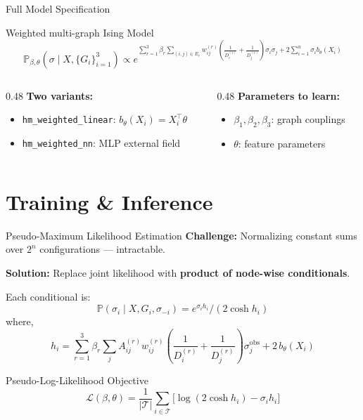 \documentclass[10pt]{beamer}
\begin{document}
\begin{frame}{Full Model Specification}
  \begin{block}{Weighted multi-graph Ising Model}
    \[
      \mathbb{P}_{\beta,\theta}(\sigma \mid X, \{G_i\}_{i=1}^3)
      \propto
      e^{\sum_{r=1}^{3} \beta_r \sum_{(i,j)\in E_r} w_{ij}^{(r)}\left(\frac{1}{D_i^{(r)}} + \frac{1}{D_j^{(r)}}\right)\sigma_i\sigma_j
        +
        2\sum_{i=1}^n \sigma_i b_\theta(X_i)}
    \]
  \end{block}

  \vspace{0.5em}
  \begin{columns}[T]
    \begin{column}{0.48\textwidth}
      \textbf{Two variants:}
      \begin{itemize}
        \item \texttt{hm\_weighted\_linear}: $b_\theta(X_i) = X_i^\top\theta$
        \item \texttt{hm\_weighted\_nn}: MLP external field
      \end{itemize}
    \end{column}
    \begin{column}{0.48\textwidth}
      \textbf{Parameters to learn:}
      \begin{itemize}
        \item $\beta_1, \beta_2, \beta_3$: graph couplings
        \item $\theta$: feature parameters
      \end{itemize}
    \end{column}
  \end{columns}
\end{frame}

\section{Training \& Inference}

\begin{frame}{Pseudo-Maximum Likelihood Estimation}
  \textbf{Challenge:} Normalizing constant sums over $2^n$ configurations --- intractable.

  \vspace{0.4em}
  \textbf{Solution:} Replace joint likelihood with \textbf{product of node-wise conditionals}.

  \vspace{0.3em}
  Each conditional is: $$\mathbb{P}(\sigma_i \mid X,G_i, \sigma_{-i}) = e^{\sigma_i h_i} / (2\cosh h_i)$$
  where,
  \[
    h_i = \sum_{r=1}^{3} \beta_r \sum_j A_{ij}^{(r)} w_{ij}^{(r)}\left(\frac{1}{D_i^{(r)}} + \frac{1}{D_j^{(r)}}\right)\sigma_j^{\text{obs}} + 2\,b_\theta(X_i)
  \]


  \begin{block}{Pseudo-Log-Likelihood Objective}
    \[
      \mathcal{L}(\beta, \theta) = \frac{1}{|\mathcal{T}|}\sum_{i\in\mathcal{T}} \bigl[\log(2\cosh h_i) - \sigma_i h_i\bigr]
    \]
  \end{block}
\end{frame}
\end{document}
